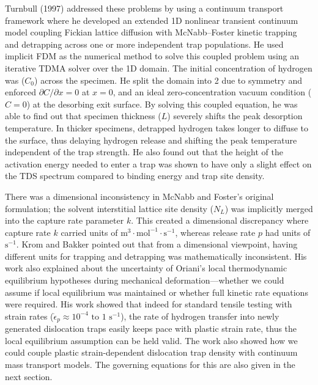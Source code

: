 \documentclass[a4paper,12pt,oneside]{report}
\begin{document}
Turnbull (1997) \cite{Turnbull1997} addressed these problems by using a continuum transport framework where he developed an extended 1D nonlinear transient continuum model coupling Fickian lattice diffusion with McNabb–Foster kinetic trapping and detrapping across one or more independent trap populations. He used implicit FDM as the numerical method to solve this coupled problem using an iterative TDMA solver over the 1D domain. The initial concentration of hydrogen was ($C_0$) across the specimen. He split the domain into 2 due to symmetry and enforced $\partial C/\partial x = 0$ at $x=0$, and an ideal zero-concentration vacuum condition ($C=0$) at the desorbing exit surface. By solving this coupled equation, he was able to find out that specimen thickness ($L$) severely shifts the peak desorption temperature. In thicker specimens, detrapped hydrogen takes longer to diffuse to the surface, thus delaying hydrogen release and shifting the peak temperature independent of the trap strength. He also found out that the height of the activation energy needed to enter a trap was shown to have only a slight effect on the TDS spectrum compared to binding energy and trap site density.

There was a dimensional inconsistency in McNabb and Foster's original formulation; the solvent interstitial lattice site density ($N_L$) was implicitly merged into the capture rate parameter $k$. This created a dimensional discrepancy where capture rate $k$ carried units of $\text{m}^3 \cdot \text{mol}^{-1} \cdot \text{s}^{-1}$, whereas release rate $p$ had units of $\text{s}^{-1}$. Krom and Bakker \cite{Krom2000} pointed out that from a dimensional viewpoint, having different units for trapping and detrapping was mathematically inconsistent. His work also explained about the uncertainty of Oriani's local thermodynamic equilibrium hypotheses during mechanical deformation—whether we could assume if local equilibrium was maintained or whether full kinetic rate equations were required. His work showed that indeed for standard tensile testing with strain rates ($\dot{\epsilon}_p \approx 10^{-4}\text{ to } 1\text{ s}^{-1}$), the rate of hydrogen transfer into newly generated dislocation traps easily keeps pace with plastic strain rate, thus the local equilibrium assumption can be held valid. The work also showed how we could couple plastic strain-dependent dislocation trap density with continuum mass transport models. The governing equations for this are also given in the next section.
\end{document}
